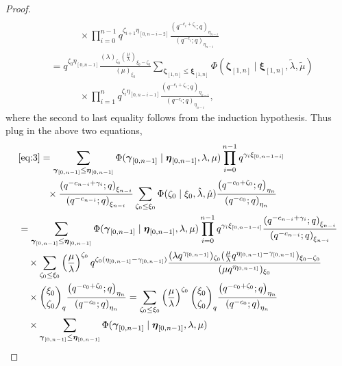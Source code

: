 \documentclass{ximera}
\begin{document}
\begin{proof}
\begin{align*}
        \\
           &\quad \quad \quad \times \prod_{i=0}^{n-1}q^{\zeta_{i+1}\eta_{[0,n-i-2]}}\frac{\left(q^{-c_{i}+\zeta_{i}};q\right)_{\eta_{n-i}}}{\left(q^{-c_{i}};q\right)_{\eta_{n-i}}}
        \\
        &=q^{\zeta_0\eta_{[0,n-1]}}\frac{(\lambda)_{\zeta_0}(\frac{\mu}{\lambda})_{\xi_0-\zeta_0}}{(\mu)_{\xi_0}}\sum_{\boldsymbol\zeta_{[1,n]}\le \boldsymbol\xi_{[1,n]}}\Phi(\boldsymbol\zeta_{[1,n]}\mid\boldsymbol\xi_{[1,n]},\tilde{\lambda},\tilde{\mu}) \\
           &\quad \quad \quad \times
        \prod_{i=1}^{n}q^{\zeta_{i}\eta_{[0,n-i-1]}}\frac{\left(q^{-c_{i}+\zeta_{i}};q\right)_{\eta_{n-i}}}{\left(q^{-c_{i}};q\right)_{\eta_{n-i}}},
\end{align*}  
where the second to last equality follows from the induction hypothesis.
Thus plug in the above two equations,
\begin{align*}
     &\text{\eqref{eq:3}}=\sum_{\boldsymbol\gamma_{[0,n-1]}\le \boldsymbol\eta_{[0,n-1]}}\Phi(\boldsymbol\gamma_{[0,n-1]}\mid\boldsymbol\eta_{[0,n-1]},\lambda,\mu)\prod_{i=0}^{n-1}q^{\gamma_i\xi_{[0,n-1-i]}}
     \\
 &\quad \quad \quad\times \frac{\left(q^{-c_{n-i}+\gamma_{i}};q\right)_{\xi_{n-i}}}{\left(q^{-c_{n-i}};q\right)_{\xi_{n-i}}} \sum_{\zeta_0\le \xi_{0}}\Phi(\zeta_0\mid\xi_{0},\hat{\lambda},\hat{\mu})\frac{\left(q^{-c_{0}+\zeta_0};q\right)_{\eta_n}}{\left(q^{-c_{0}};q\right)_{\eta_n}}\\
    & =\sum_{\boldsymbol\gamma_{[0,n-1]}\le \boldsymbol\eta_{[0,n-1]}}\Phi(\boldsymbol\gamma_{[0,n-1]}\mid\boldsymbol\eta_{[0,n-1]},\lambda,\mu)\prod_{i=0}^{n-1}q^{\gamma_i\xi_{[0,n-1-i]}}\frac{\left(q^{-c_{n-i}+\gamma_{i}};q\right)_{\xi_{n-i}}}{\left(q^{-c_{n-i}};q\right)_{\xi_{n-i}}}\\
      &  \quad   \times
        \sum_{\zeta_0\le \xi_{0}}\left(\frac{\mu}{\lambda}\right)^{\zeta_0}q^{\zeta_0(\eta_{[0,n-1]}-\gamma_{[0,n-1]})}\frac{(\lambda q^{\gamma_{[0,n-1]}})_{\zeta_0}(\frac{\mu}{\lambda} q^{\eta_{[0,n-1]}-\gamma_{[0,n-1]}})_{\xi_{0}-\zeta_0}}{(\mu q^{\eta_{[0,n-1]}})_{\xi_{0}}} \\ 
        &     \quad  \times \binom{\xi_{0}}{\zeta_0}_q\frac{\left(q^{-c_{0}+\zeta_0};q\right)_{\eta_n}}{\left(q^{-c_{0}};q\right)_{\eta_n}}
        = \sum_{\zeta_0\le \xi_{0}}\left(\frac{\mu}{\lambda}\right)^{\zeta_0} \binom{\xi_{0}}{\zeta_0}_q\frac{\left(q^{-c_{0}+\zeta_0};q\right)_{\eta_n}}{\left(q^{-c_{0}};q\right)_{\eta_n}} \\    &   \quad  \times \sum_{\boldsymbol\gamma_{[0,n-1]}\le \boldsymbol\eta_{[0,n-1]}}\Phi(\boldsymbol\gamma_{[0,n-1]}\mid\boldsymbol\eta_{[0,n-1]},\lambda,\mu)

\end{align*}
\end{proof}
\end{document}
